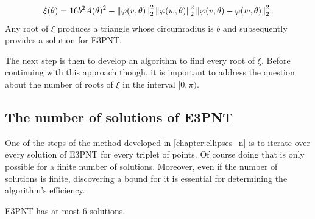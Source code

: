 \begin{equation}\label{eq:circumscribed_circle_b}
\xi(\theta) = 16b^2A(\theta)^2 - \left\lVert\varphi(v, \theta)\right\rVert_{2}^2\left\lVert\varphi(w, \theta)\right\rVert_{2}^2\left\lVert\varphi(v, \theta)-\varphi(w, \theta)\right\rVert_{2}^2.
\end{equation}
Any root of $\xi$ produces a triangle whose circumradius is $b$ and subsequently provides a solution for E3PNT.

The next step is then to develop an algorithm to find every root of $\xi$.
Before continuing with this approach though, it is important to address the question about the number of roots of $\xi$ in the interval $[0, \pi)$.

\subsection{The number of solutions of E3PNT}

One of the steps of the method developed in \autoref{chapter:ellipses_n} is to iterate over every solution of E3PNT for every triplet of points. Of course doing that is only possible for a finite number of solutions. Moreover, even if the number of solutions is finite, discovering a bound for it is essential for determining the algorithm's efficiency.

\begin{lema}\label{lema:e3p}
	E3PNT has at most $6$ solutions.
\end{lema}

